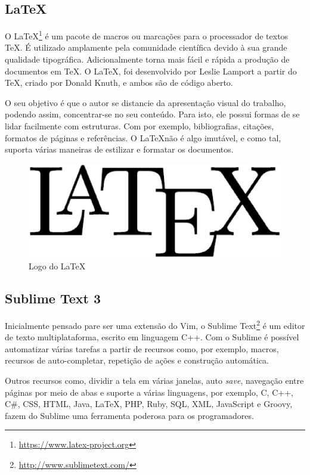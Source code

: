\subsection{LaTeX}

O \LaTeX\footnote{\url{https://www.latex-project.org}} é um pacote de macros ou marcações para o processador de textos \TeX. É utilizado amplamente pela comunidade científica devido à sua grande qualidade tipográfica. Adicionalmente torna mais fácil e rápida a produção de documentos em \TeX. O \LaTeX, foi desenvolvido por Leslie Lamport a partir do \TeX, criado por Donald Knuth, e ambos são de código aberto.

O seu objetivo é que o autor se distancie da apresentação visual do trabalho, podendo assim, concentrar-se no seu conteúdo. Para isto, ele possui formas de se lidar facilmente com estruturas. Com por exemplo, bibliografias, citações, formatos de páginas e referências. O \LaTeX não é algo imutável, e como tal, suporta várias maneiras de estilizar e formatar os documentos.

\begin{figure}[!h]
	\centering
	\includegraphics[scale=0.3]{figuras/capitulo3/latex.eps}
	\caption{Logo do \LaTeX}
	\label{latex}
\end{figure}

\subsection{Sublime Text 3}

Inicialmente pensado pare ser uma extensão do Vim, o Sublime Text\footnote{\url{http://www.sublimetext.com/}} é um editor de texto multiplataforma, escrito em linguagem C++. Com o Sublime é possível automatizar várias tarefas a partir de recursos como, por exemplo, macros, recursos de auto-completar, repetição de ações e construção automática.

Outros recursos como, dividir a tela em várias janelas, auto \textit{save}, navegação entre páginas por meio de abas e suporte a várias linguagens, por exemplo, C, C++, C\#, CSS, HTML, Java, \LaTeX, PHP, Ruby, SQL, XML, JavaScript e Groovy, fazem do Sublime uma ferramenta poderosa para os programadores.

